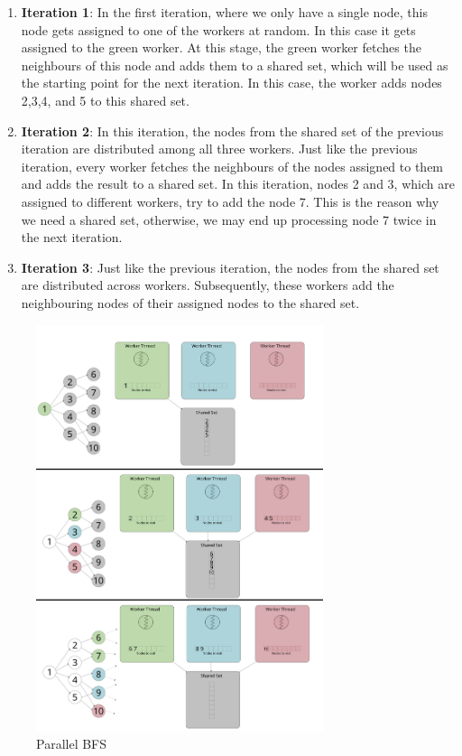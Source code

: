 \begin{enumerate}
    \item \textbf{Iteration 1}: In the first iteration, where we only have a
        single node, this node gets assigned to one of the workers at
        random. In this case it gets assigned to the green worker. At this
        stage, the green worker fetches the neighbours of this node and adds
        them to a shared set, which will be used as the starting point for the
        next iteration. In this case, the worker adds nodes 2,3,4, and 5 to this
        shared set.
    \item \textbf{Iteration 2}: In this iteration, the nodes from the shared set
        of the previous iteration are distributed among all three workers. Just
        like the previous iteration, every worker fetches the neighbours of the
        nodes assigned to them and adds the result to a shared set. In this
        iteration, nodes 2 and 3, which are assigned to different workers, try
        to add the node 7. This is the reason why we need a shared set,
        otherwise, we may end up processing node 7 twice in the next iteration.
    \item \textbf{Iteration 3}: Just like the previous iteration, the nodes from
        the shared set are distributed across workers. Subsequently, these
        workers add the neighbouring nodes of their assigned nodes to the shared
        set.
\end{enumerate}
\begin{figure}[ht]
    \centering
    \includegraphics[width=0.75\textwidth]{figures/parallelBFS.png}
    \caption{Parallel BFS}
    \label{fig:parallelBFS}
\end{figure}

